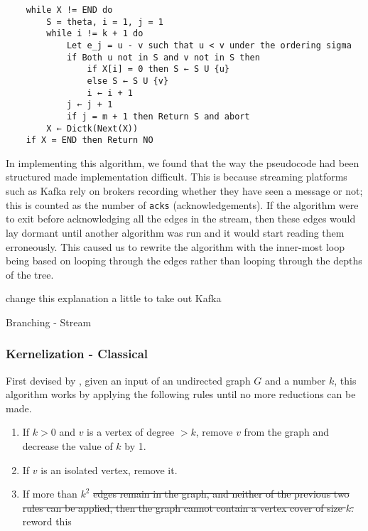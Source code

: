 \begin{verbatim}
    while X != END do
        S = theta, i = 1, j = 1
        while i != k + 1 do
            Let e_j = u - v such that u < v under the ordering sigma
            if Both u not in S and v not in S then
                if X[i] = 0 then S ← S U {u}
                else S ← S U {v}
                i ← i + 1
            j ← j + 1
            if j = m + 1 then Return S and abort
        X ← Dictk(Next(X))
    if X = END then Return NO
\end{verbatim}

In implementing this algorithm, we found that the way the pseudocode had
been structured made implementation difficult. This is because streaming
platforms such as Kafka rely on brokers recording whether they have seen
a message or not; this is counted as the number of \texttt{acks}
(acknowledgements). If the algorithm were to exit before acknowledging
all the edges in the stream, then these edges would lay dormant until
another algorithm was run and it would start reading them erroneously.
This caused us to rewrite the algorithm with the inner-most loop being
based on looping through the edges rather than looping through the
depths of the tree.

change this explanation a little to take out Kafka

\begin{algorithm}[H]
    \caption{Branching - Stream}
    \DontPrintSemicolon
\end{algorithm}

\subsubsection{Kernelization - Classical}

First devised by \cite{buss1991nondeterminism}, given an input of an
undirected graph \(G\) and a number \(k\), this algorithm works by
applying the following rules until no more reductions can be made.

\begin{enumerate}
    \item
          If \(k > 0\) and \(v\) is a vertex of degree \(> k\), remove \(v\)
          from the graph and decrease the value of \(k\) by 1.
    \item
          If \(v\) is an isolated vertex, remove it.
    \item
          If more than \(k^2\) \sout{edges remain in the graph, and neither of
              the previous two rules can be applied, then the graph cannot contain a
              vertex cover of size \(k\).} reword this
\end{enumerate}

